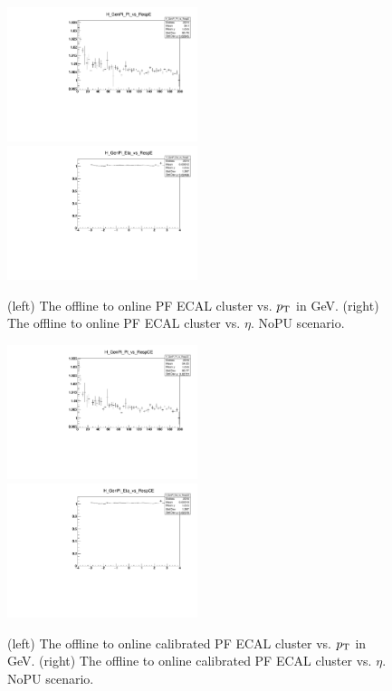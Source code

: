 
\begin{figure}
\includegraphics[width=0.495\textwidth]{./plots_pdf/ECAL_plots/Prod6/NoPU/H_GenPi_Pt_vs_RespE.pdf}
\includegraphics[width=0.495\textwidth]{./plots_pdf/ECAL_plots/Prod6/NoPU/H_GenPi_Eta_vs_RespE.pdf}
\caption [HLT vs. offline PF ECAL cluster - NoPU scenario]{(left) The offline to online PF ECAL cluster vs. $p_{\mathrm{T}}$ in GeV. (right) The offline to online PF ECAL cluster vs. $\eta$. NoPU scenario.}
\label{fig:NoPU_ECAL_Offline_vs_Online_E}
\end{figure}

\begin{figure}
\includegraphics[width=0.495\textwidth]{./plots_pdf/ECAL_plots/Prod6/NoPU/H_GenPi_Pt_vs_RespCE.pdf}
\includegraphics[width=0.495\textwidth]{./plots_pdf/ECAL_plots/Prod6/NoPU/H_GenPi_Eta_vs_RespCE.pdf}
\caption[HLT vs. offline calibrated PF ECAL cluster - NoPU scenario]{(left) The offline to online calibrated PF ECAL cluster vs. $p_{\mathrm{T}}$ in GeV. (right) The offline to online calibrated PF ECAL cluster vs. $\eta$.
  NoPU scenario.}
\label{fig:NoPU_ECAL_Offline_vs_Online_CE}
\end{figure}                                                                                                                                                                       


